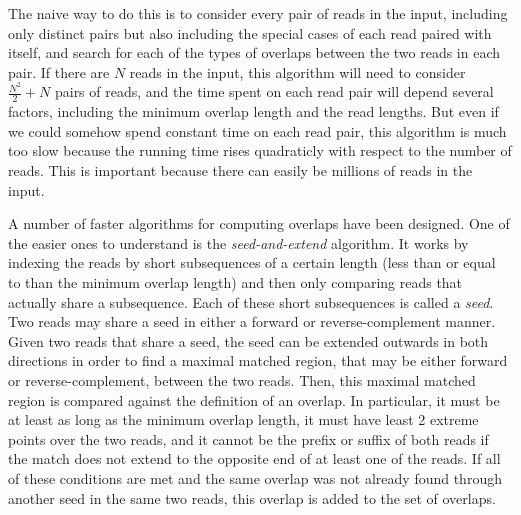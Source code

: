 \documentclass[10pt]{article}
\newcommand{\KeyTerm}[1]{{\it #1}}
\begin{document}
The naive way to do this is to consider every pair of reads in the input,
including only distinct pairs but also including the special cases of each read
paired with itself, and search for each of the types of overlaps between the two
reads in each pair.  If there are $N$ reads in the input, this algorithm will
need to consider $\frac{N^2}{2} + N$ pairs of reads, and the time spent on each
read pair will depend several factors, including the minimum overlap length and
the read lengths.  But even if we could somehow spend constant time on each read
pair, this algorithm is much too slow because the running time rises quadraticly
with respect to the number of reads.  This is important because there can easily
be millions of reads in the input.

A number of faster algorithms for computing overlaps have been designed.  One of
the easier ones to understand is the \KeyTerm{seed-and-extend} algorithm.  It
works by indexing the reads by short subsequences of a certain length (less than
or equal to than the minimum overlap length) and then only comparing reads that
actually share a subsequence.  Each of these short subsequences is called a
\KeyTerm{seed}.  Two reads may share a seed in either a forward or
reverse-complement manner.  Given two reads that share a seed, the seed can be
extended outwards in both directions in order to find a maximal matched region,
that may be either forward or reverse-complement, between the two reads.  Then,
this maximal matched region is compared against the definition of an overlap.
In particular, it must be at least as long as the minimum overlap length, it
must have least 2 extreme points over the two reads, and it cannot be the prefix
or suffix of both reads if the match does not extend to the opposite end of at
least one of the reads.  If all of these conditions are met and the same overlap
was not already found through another seed in the same two reads, this overlap
is added to the set of overlaps.
\end{document}
